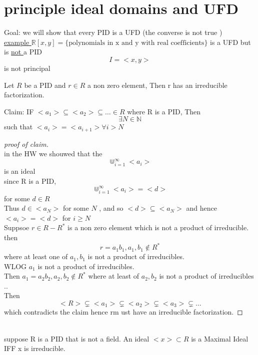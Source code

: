 \documentclass{article}
\begin{document}
\section{principle ideal domains and UFD}
Goal: we will show that every PID is a UFD  (the converse is not true ) \\ 
\underline{example } $\mathbb{R}[x,y] = \{\text{polynomials in x and y with real coefficients}\}$ is a UFD but is \underline{not } a PID
$$I = <x,y>$$ is not principal

\begin{lemma}[3.5.5]

    Let $R$ be a PID and $r \in R$ a non zero element, Then r has an irreducible factorization. 

\end{lemma}
    
        Claim: IF $<a_1> \subseteq <a_2> \subseteq \dots \in R$ where R is a PID, Then $$\exists N \in \mathbb{N}$$ such that $<a_i> = <a_{i+1}> \forall i > N$ 
    \begin{proof}[proof of claim] \leavevmode \\ 
        in the HW we shouwed that the $$\Cup_{i=1}^{\infty} <a_i> $$ is an ideal  \\ since R is a PID,$$\Cup_{i=1}^{\infty} <a_i>  = <d> $$ for some $d \in R$ \\ 
        Thus $d \in <a_N>$ for some $N$ , and so $<d> \subseteq <a_N>$ and hence $<a_i> = <d>$ for $i \geq N$  \\ 
        Suppsoe $r \in R - R^*$ is a non zero element which is not a product of irreducible.  then \\ 
        $$r = a_1b_1, a_1, b_1 \not \in R^*$$ 
        where at least one of $a_1, b_1$ is not a product of irreducibles. \\ 
        WLOG $a_1$ is not a product of irreducibles. \\ Then $a_1 = a_2b_2, a_2,b_2 \not \in R^*$  where at least of $a_2,b_2$ is not a product of irreducibles .. 
        \\ 
        Then 
        $$<R> \subsetneq <a_1> \subsetneq <a_2> \subsetneq <a_3> \subsetneq \dots $$ which contradicts the claim hence rm ust have an irreducible factorization.

    \end{proof}
    \begin{proposition}[3.5.6] \leavevmode\\ 
        suppose R is a PID that is not a field. An ideal $<x> \subset R$ is a Maximal Ideal IFF x is irreducible. 

    \end{proposition}
\end{document}
